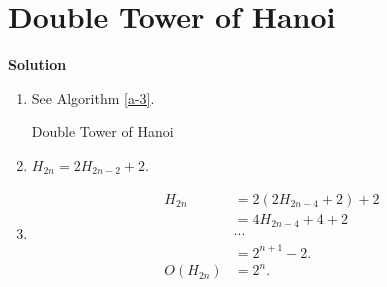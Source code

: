 \documentclass{../../cls/sig-alternate-05-2015}
\begin{document}
\section{Double Tower of Hanoi}
\textbf{Solution}\begin{enumerate}[label=(\alph*)]
	\item See Algorithm \ref{a-3}.
	\begin{algorithm}
		\caption{Double Tower of Hanoi}
		\label{a-3}
		\begin{algorithmic}
			\State \Return
			\State {}
			\State {}
			\Else
			\State {}
			\State {}
			\State {}
			\EndIf
			\EndProcedure
		\end{algorithmic}
	\end{algorithm}

	\item $H_{2n} = 2H_{2n - 2} + 2$.
	\item \begin{align}
		H_{2n} & = 2(2H_{2n - 4} + 2) + 2\\
		& = 4H_{2n - 4} + 4 + 2\\
		& \cdots\\
		& = 2^{n + 1} - 2.\\
		O(H_{2n}) & = 2^n.
	\end{align}
\end{enumerate}
\end{document}
